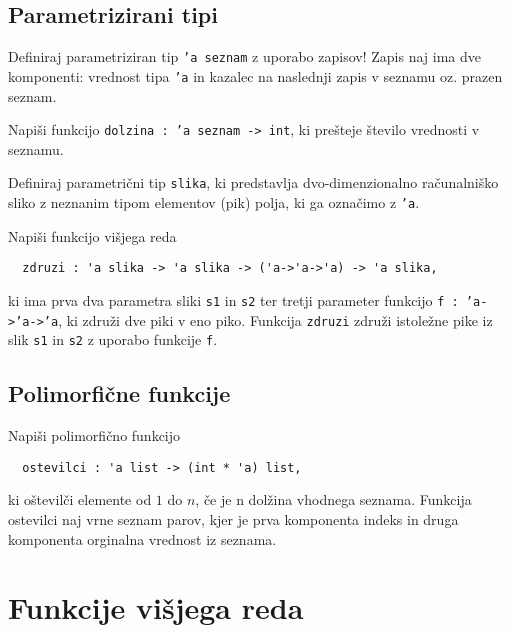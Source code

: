 \subsection{Parametrizirani tipi}

\begin{ex}
  Definiraj parametriziran tip \texttt{'a seznam} z uporabo zapisov!
  Zapis naj ima dve komponenti: vrednost tipa \texttt{'a} in kazalec na
  naslednji zapis v seznamu oz. prazen seznam.

  Napi\v si funkcijo \texttt{dolzina : 'a seznam -> int}, ki
  pre\v steje \v stevilo vrednosti v seznamu.


\end{ex} 
\begin{ex}
  Definiraj parametri\v cni tip \texttt{slika}, ki predstavlja
  dvo-dimenzionalno ra\v cunalni\v sko sliko z neznanim tipom
  elementov (pik) polja, ki ga ozna\v cimo z \texttt{'a}.

  Napi\v si funkcijo vi\v sjega reda

  \begin{verbatim}
  zdruzi : 'a slika -> 'a slika -> ('a->'a->'a) -> 'a slika,
  \end{verbatim}

  ki ima prva dva parametra sliki \texttt{s1} in \texttt{s2} ter
  tretji parameter funkcijo \texttt{f : 'a->'a->'a}, ki zdru\v zi dve
  piki v eno piko. Funkcija \texttt{zdruzi} zdru\v zi istole\v zne
  pike iz slik \texttt{s1} in \texttt{s2} z uporabo funkcije
  \texttt{f}.


\end{ex} 

\subsection{Polimorfi\v cne funkcije}

\begin{ex}
  Napi\v si polimorfi\v cno funkcijo
  \begin{verbatim}
  ostevilci : 'a list -> (int * 'a) list, 
  \end{verbatim}
  ki o\v stevil\v ci elemente od $1$ do $n$, \v ce je n dol\v zina
  vhodnega seznama. Funkcija ostevilci naj vrne seznam parov, kjer je
  prva komponenta indeks in druga komponenta orginalna vrednost iz
  seznama.

\end{ex} 

\section{Funkcije vi\v sjega reda}

